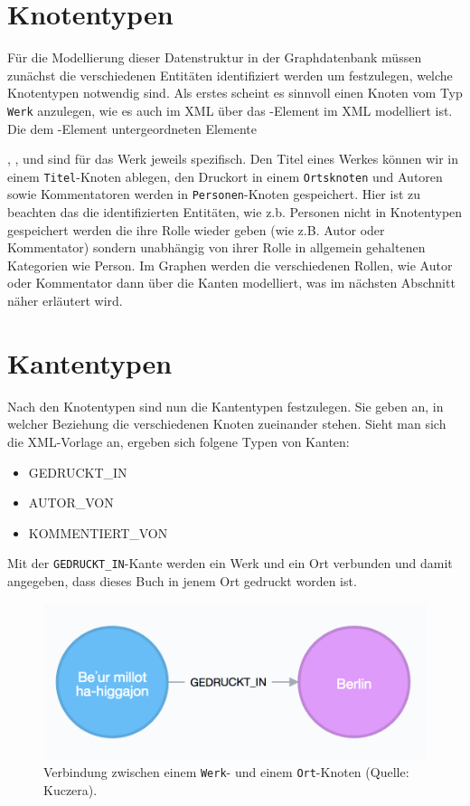 \documentclass[ngerman,]{scrreprt}
\providecommand{\tightlist}{%
  \setlength{\itemsep}{0pt}\setlength{\parskip}{0pt}}
\begin{document}
\section{Knotentypen}\label{knotentypen}

Für die Modellierung dieser Datenstruktur in der Graphdatenbank müssen zunächst die verschiedenen Entitäten identifiziert werden um festzulegen, welche Knotentypen notwendig sind. Als erstes scheint es sinnvoll einen Knoten vom Typ \texttt{Werk} anzulegen, wie es auch im XML über das -Element im XML modelliert ist. Die dem -Element untergeordneten Elemente

, , und sind für das Werk jeweils spezifisch. Den Titel eines Werkes können wir in einem \texttt{Titel}-Knoten ablegen, den Druckort in einem \texttt{Ortsknoten} und Autoren sowie Kommentatoren werden in \texttt{Personen}-Knoten gespeichert. Hier ist zu beachten das die identifizierten Entitäten, wie z.b. Personen nicht in Knotentypen gespeichert werden die ihre Rolle wieder geben (wie z.B. Autor oder Kommentator) sondern unabhängig von ihrer Rolle in allgemein gehaltenen Kategorien wie Person. Im Graphen werden die verschiedenen Rollen, wie Autor oder Kommentator dann über die Kanten modelliert, was im nächsten Abschnitt näher erläutert wird.

\section{Kantentypen}\label{kantentypen}

Nach den Knotentypen sind nun die Kantentypen festzulegen. Sie geben an, in welcher Beziehung die verschiedenen Knoten zueinander stehen. Sieht man sich die XML-Vorlage an, ergeben sich folgene Typen von Kanten:

\begin{itemize}
\tightlist
\item
  GEDRUCKT\_IN
\item
  AUTOR\_VON
\item
  KOMMENTIERT\_VON
\end{itemize}

Mit der \texttt{GEDRUCKT\_IN}-Kante werden ein Werk und ein Ort verbunden und damit angegeben, dass dieses Buch in jenem Ort gedruckt worden ist.

\begin{figure}
\centering
\includegraphics{Bilder/Werk-Ort.png}
\caption{Verbindung zwischen einem \texttt{Werk}- und einem \texttt{Ort}-Knoten (Quelle: Kuczera).}
\end{figure}
\end{document}
